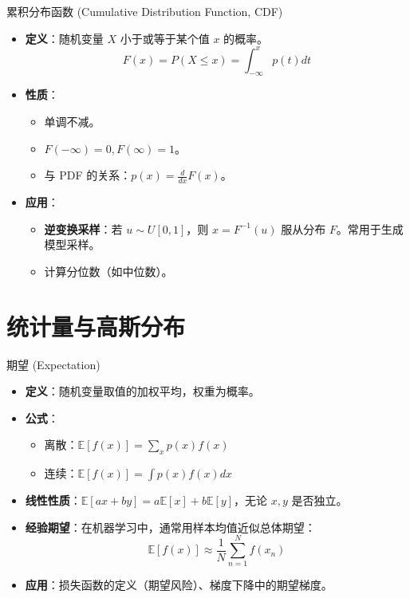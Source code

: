 \documentclass[12pt, aspectratio=169]{beamer}
\newcommand{\E}{\mathbb{E}}
\begin{document}
\begin{frame}{累积分布函数 (Cumulative Distribution Function, CDF)}
    \begin{itemize}
        \item \textbf{定义}：随机变量 $X$ 小于或等于某个值 $x$ 的概率。
        $$ F(x) = P(X \le x) = \int_{-\infty}^x p(t) dt $$
        \item \textbf{性质}：
        \begin{itemize}
            \item 单调不减。
            \item $F(-\infty) = 0, F(\infty) = 1$。
            \item 与 PDF 的关系：$p(x) = \frac{d}{dx} F(x)$。
        \end{itemize}
        \item \textbf{应用}：
        \begin{itemize}
            \item \textbf{逆变换采样}：若 $u \sim U[0,1]$，则 $x = F^{-1}(u)$ 服从分布 $F$。常用于生成模型采样。
            \item 计算分位数（如中位数）。
        \end{itemize}
    \end{itemize}
\end{frame}

\section{统计量与高斯分布}

\begin{frame}{期望 (Expectation)}
    \begin{itemize}
        \item \textbf{定义}：随机变量取值的加权平均，权重为概率。
        \item \textbf{公式}：
        \begin{itemize}
            \item 离散：$\E[f(x)] = \sum_x p(x) f(x)$
            \item 连续：$\E[f(x)] = \int p(x) f(x) dx$
        \end{itemize}
        \item \textbf{线性性质}：$\E[ax + by] = a\E[x] + b\E[y]$，无论 $x, y$ 是否独立。
        \item \textbf{经验期望}：在机器学习中，通常用样本均值近似总体期望：
        $$ \E[f(x)] \approx \frac{1}{N} \sum_{n=1}^N f(x_n) $$
        \item \textbf{应用}：损失函数的定义（期望风险）、梯度下降中的期望梯度。
    \end{itemize}
\end{frame}
\end{document}
